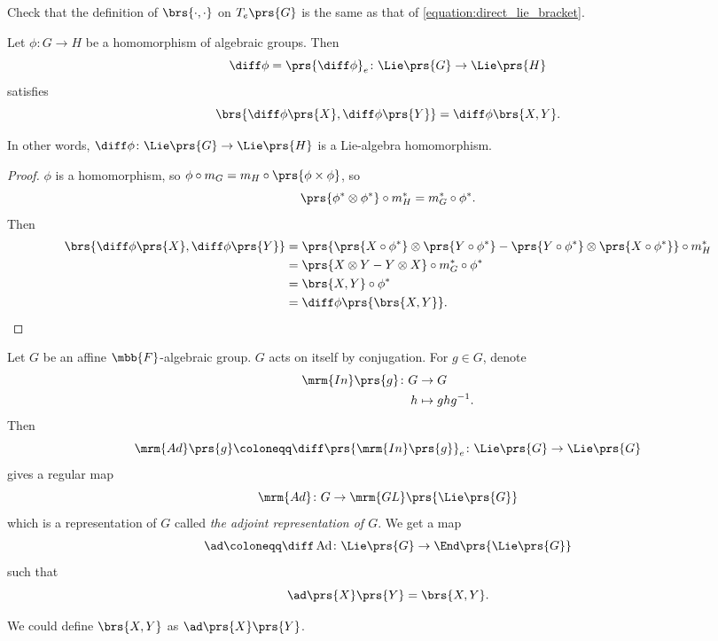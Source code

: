 \documentclass[10pt,a4paper,twoside,openany,hidelinks]{book}
\DeclareMathOperator{\Ad}{Ad}
\begin{document}
\begin{exercise}
Check that the definition of $\brs{\cdot,\cdot}$ on $T_e\prs{G}$ is the same as that of \eqref{equation:direct_lie_bracket}.
\end{exercise}

\begin{proposition}
Let $\phi \colon G \to H$ be a homomorphism of algebraic groups. Then
\[\diff \phi = \prs{\diff \phi}_e \colon \Lie\prs{G} \to \Lie\prs{H}\]
satisfies
\[\brs{\diff \phi\prs{X}, \diff \phi\prs{Y}} = \diff \phi \brs{X,Y} \text{.}\]

In other words, $\diff \phi \colon \Lie\prs{G} \to \Lie\prs{H}$ is a Lie-algebra homomorphism.
\end{proposition}

\begin{proof}
$\phi$ is a homomorphism, so $\phi \circ m_G = m_H \circ \prs{\phi \times \phi}$, so
\[\prs{\phi^* \otimes \phi^*} \circ m_H^* = m_G^* \circ \phi^* \text{.}\]
Then
\begin{align*}
\brs{\diff \phi\prs{X}, \diff \phi\prs{Y}} &= \prs{\prs{X \circ \phi^*} \otimes \prs{Y \circ \phi^*} - \prs{Y \circ \phi^*} \otimes \prs{X \circ \phi^*}} \circ m_H^*
\\&= \prs{X \otimes Y - Y \otimes X} \circ m_G^* \circ \phi^*
\\&= \brs{X,Y} \circ \phi^*
\\&= \diff \phi\prs{\brs{X,Y}} \text{.}
\end{align*}
\end{proof}



Let $G$ be an affine $\mbb{F}$-algebraic group.
$G$ acts on itself by conjugation.
For $g \in G$, denote
\begin{align*}
\mrm{In}\prs{g} \colon G &\to G \\
h &\mapsto g h g^{-1} \text{.}
\end{align*}
Then
\[\mrm{Ad}\prs{g} \coloneqq \diff \prs{\mrm{In}\prs{g}}_e \colon \Lie\prs{G} \to \Lie\prs{G}\]
gives a regular map
\[\mrm{Ad} \colon G \to \mrm{GL}\prs{\Lie\prs{G}}\]
which is a representation of $G$ called \emph{the adjoint representation of $G$}.
We get a map
\begin{align*}
\ad \coloneqq \diff\Ad \colon \Lie\prs{G} \to \End\prs{\Lie\prs{G}}
\end{align*}
such that
\[\ad\prs{X}\prs{Y} = \brs{X,Y} \text{.}\]

\begin{exercise}
We could define $\brs{X,Y}$ as $\ad\prs{X}\prs{Y}$.
\end{exercise}
\end{document}
